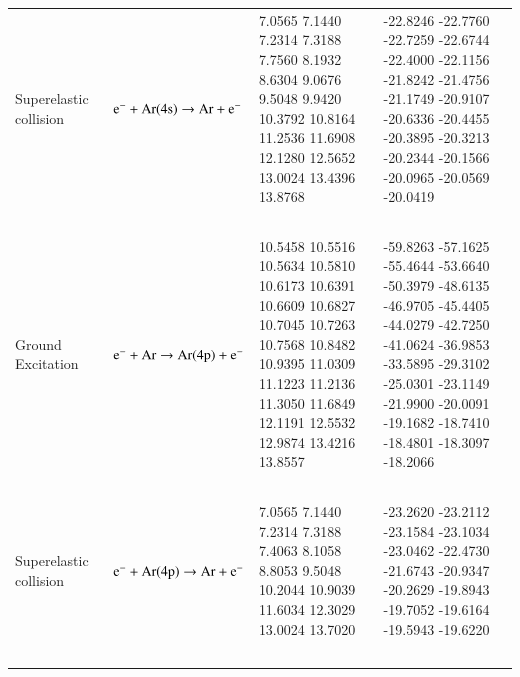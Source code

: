 \documentclass{warpdoc}
\begin{document}
\begin{table}[!ht]
\begin{threeparttable}
\begin{tabular*}{\textwidth}{@{}l@{\extracolsep{\fill}}lll@{}}
Superelastic collision & ~{$\rm e^- + Ar(4s) \rightarrow Ar  + e^-$  } &   \begin{minipage}[t]{0.28\textwidth}\raggedright  
      7.0565
      7.1440
      7.2314
      7.3188
      7.7560
      8.1932
      8.6304
      9.0676
      9.5048
      9.9420
      10.3792
      10.8164
      11.2536
      11.6908
      12.1280
      12.5652
      13.0024
      13.4396
      13.8768

 \end{minipage}  & \begin{minipage}[t]{0.28\textwidth}\raggedright 
      -22.8246
      -22.7760
      -22.7259
      -22.6744
      -22.4000
      -22.1156
      -21.8242
      -21.4756
      -21.1749
      -20.9107
      -20.6336
      -20.4455
      -20.3895
      -20.3213
      -20.2344
      -20.1566
      -20.0965
      -20.0569
      -20.0419

\end{minipage} \\         
~\\

Ground Excitation & ~{$\rm e^- + Ar \rightarrow Ar(4p) + e^- $  } &   \begin{minipage}[t]{0.28\textwidth}\raggedright  
      10.5458
      10.5516
      10.5634
      10.5810
      10.6173
      10.6391
      10.6609
      10.6827
      10.7045
      10.7263
      10.7568
      10.8482
      10.9395
      11.0309
      11.1223
      11.2136
      11.3050
      11.6849
      12.1191
      12.5532
      12.9874
      13.4216
      13.8557
 \end{minipage}  & \begin{minipage}[t]{0.28\textwidth}\raggedright 
      -59.8263
      -57.1625
      -55.4644
      -53.6640
      -50.3979
      -48.6135
      -46.9705
      -45.4405
      -44.0279
      -42.7250
      -41.0624
      -36.9853
      -33.5895
      -29.3102
      -25.0301
      -23.1149
      -21.9900
      -20.0091
      -19.1682
      -18.7410
      -18.4801
      -18.3097
      -18.2066
\end{minipage} \\         
~\\

Superelastic collision & ~{$\rm e^- + Ar(4p) \rightarrow Ar  + e^-$  } &   \begin{minipage}[t]{0.28\textwidth}\raggedright  
7.0565
7.1440
7.2314
7.3188
7.4063
8.1058
8.8053
9.5048
10.2044
10.9039
11.6034
12.3029
13.0024
13.7020
 \end{minipage}  & \begin{minipage}[t]{0.28\textwidth}\raggedright 
-23.2620
-23.2112
-23.1584
-23.1034
-23.0462
-22.4730
-21.6743
-20.9347
-20.2629
-19.8943
-19.7052
-19.6164
-19.5943
-19.6220
\end{minipage} \\         
~\\


\end{tabular*}
\end{threeparttable}
\end{table}
\end{document}
